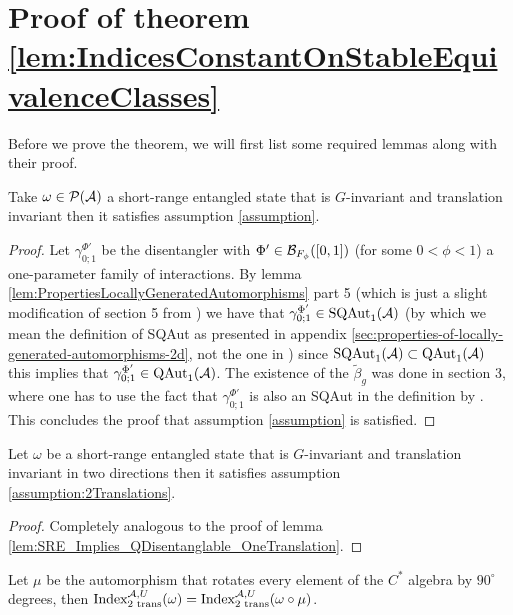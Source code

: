 \documentclass[11pt,a4paper,twoside]{article}
\numberwithin{equation}{section}
\begin{document}
	\section{Proof of theorem \ref{lem:IndicesConstantOnStableEquivalenceClasses}}\label{sec:ProofOfMainResult1}\label{sec:ProofOf:lem:IndicesConstantOnStableEquivalenceClasses}
	Before we prove the theorem, we will first list some required lemmas along with their proof.
	\begin{lemma}\label{lem:SRE_Implies_QDisentanglable_OneTranslation}
		Take $\omega\in\PP(\AA)$ a short-range entangled state that is $G$-invariant and translation invariant then it satisfies assumption \ref{assumption}.
	\end{lemma}
	\begin{proof}
		Let $\gamma^{\Phi'}_{0;1}$ be the disentangler with $\Phi'\in\BB_{F_\phi}([0,1])$ (for some $0<\phi<1$) a one-parameter family of interactions. By lemma \ref{lem:PropertiesLocallyGeneratedAutomorphisms} part 5 (which is just a slight modification of section 5 from \cite{ogata2021h3gmathbb}) we have that $\gamma^{\Phi'}_{0;1}\in\textrm{SQAut}_1(\AA)$ (by which we mean the definition of SQAut as presented in appendix \ref{sec:properties-of-locally-generated-automorphisms-2d}, not the one in \cite{ogata2021h3gmathbb}) since $\textrm{SQAut}_1(\AA)\subset\QAut{\AA}$ this implies that $\gamma^{\Phi'}_{0;1}\in\QAut{\AA}$. The existence of the $\tilde{\beta}_g$ was done in \cite{ogata2021h3gmathbb} section 3, where one has to use the fact that $\gamma^{\Phi'}_{0;1}$ is also an SQAut in the definition by \cite{ogata2021h3gmathbb}. This concludes the proof that assumption \ref{assumption} is satisfied.
	\end{proof}
	\begin{lemma}\label{lem:SRE_Implies_QDisentanglable_TwoTranslations}
		Let $\omega$ be a short-range entangled state that is $G$-invariant and translation invariant in two directions then it satisfies assumption \ref{assumption:2Translations}.
	\end{lemma}
	\begin{proof}
		Completely analogous to the proof of lemma \ref{lem:SRE_Implies_QDisentanglable_OneTranslation}.
	\end{proof}
	\begin{lemma}\label{lem:RotationDoesn'tChangeH1Index}
		Let $\mu$ be the automorphism that rotates every element of the $C^*$ algebra by $90^\circ$ degrees, then $\textrm{Index}_{\text{2 trans}}^{\AA,U}(\omega)=\textrm{Index}_{\text{2 trans}}^{\AA,U}(\omega\circ\mu)$.
	\end{lemma}
\end{document}
